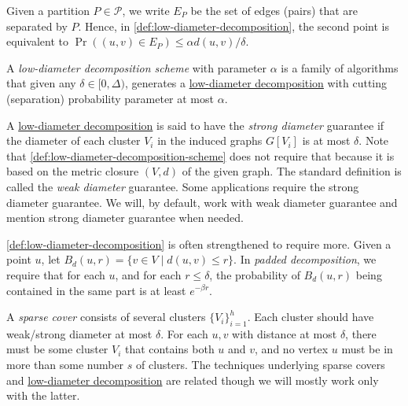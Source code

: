 Given a partition \(P \in \mathcal{P} \), we write \(E_P\) be the set of edges (pairs) that are separated by \(P\). Hence, in \autoref{def:low-diameter-decomposition}, the second point is equivalent to \(\Pr((u, v) \in E_P) \leq \alpha d(u, v) / \delta \).

\begin{definition}\label{def:low-diameter-decomposition-scheme}
	A \emph{low-diameter decomposition scheme} with parameter \(\alpha \) is a family of algorithms that given any \(\delta \in [0, \Delta )\), generates a \hyperref[def:low-diameter-decomposition]{low-diameter decomposition} with cutting (separation) probability parameter at most \(\alpha \).
\end{definition}

\begin{notation}
	A \hyperref[def:low-diameter-decomposition]{low-diameter decomposition} is said to have the \emph{strong diameter} guarantee if the diameter of each cluster \(V_i\) in the induced graphs \(G[V_i]\) is at most \(\delta \). Note that \autoref{def:low-diameter-decomposition-scheme} does not require that because it is based on the metric closure \((V, d)\) of the given graph. The standard definition is called the \emph{weak diameter} guarantee. Some applications require the strong diameter guarantee. We will, by default, work with weak diameter guarantee and mention strong diameter guarantee when needed.
\end{notation}

\begin{note}
	\autoref{def:low-diameter-decomposition} is often strengthened to require more. Given a point \(u\), let \(B_d(u, r) = \{ v \in V \mid d(u, v) \leq r \} \). In \emph{padded decomposition}, we require that for each \(u\), and for each \(r \leq \delta \), the probability of \(B_d(u, r)\) being contained in the same part is at least \(e^{-\beta r}\).
\end{note}

\begin{remark}
	A \emph{sparse cover} consists of several clusters \(\{ V_i \} _{i = 1}^{h}\). Each cluster should have weak/strong diameter at most \(\delta \). For each \(u, v\) with distance at most \(\delta \), there must be some cluster \(V_i\) that contains both \(u\) and \(v\), and no vertex \(u\) must be in more than some number \(s\) of clusters. The techniques underlying sparse covers and \hyperref[def:low-diameter-decomposition]{low-diameter decomposition} are related though we will mostly work only with the latter.
\end{remark}

